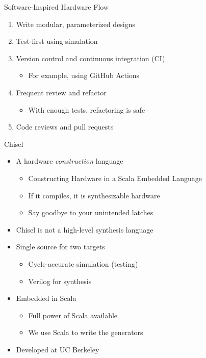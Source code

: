 \begin{frame}{Software-Inspired Hardware Flow}
\begin{enumerate}
    \item Write modular, parameterized designs
    \item Test-first using simulation
    \item Version control and continuous integration (CI)
    \begin{itemize}
\item For example, using GitHub Actions
\end{itemize}
    \item Frequent review and refactor
    \begin{itemize}
\item With enough tests, refactoring is safe
\end{itemize}
    \item Code reviews and pull requests
\end{enumerate}
\end{frame}

\begin{frame}[fragile]{Chisel}
\begin{itemize}
\item A hardware \emph{construction} language
\begin{itemize}
\item Constructing Hardware in a Scala Embedded Language
\item If it compiles, it is synthesizable hardware 
\item Say goodbye to your unintended latches
\end{itemize}
\item Chisel is not a high-level synthesis language
\item Single source for two targets
\begin{itemize}
\item Cycle-accurate simulation (testing)
\item Verilog for synthesis
\end{itemize}
\item Embedded in Scala
\begin{itemize}
\item Full power of Scala available
\item We use Scala to write the generators
\end{itemize}
\item Developed at UC Berkeley
\end{itemize}
\end{frame}

